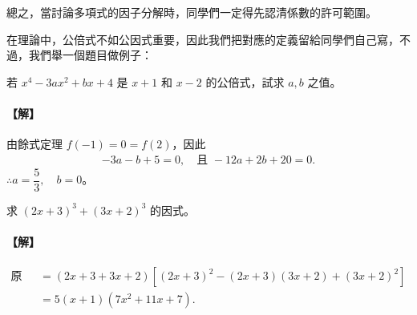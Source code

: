 總之，當討論多項式的因子分解時，同學們一定得先認清係數的許可範圍。

在理論中，公倍式不如公因式重要，因此我們把對應的定義留給同學們自己寫，不過，我們舉一個題目做例子：

\begin{example}\label{ex:7-2-4}
若 $x^4-3ax^2+bx+4$ 是 $x+1$ 和 $x-2$ 的公倍式，試求 $a, b$ 之值。

\paragraph{【解】}
由餘式定理 $f(-1) = 0 = f(2)$，因此
\begin{align*}
  -3a-b+5 = 0, \quad \text{且 } -12a+2b+20 = 0.
\end{align*}
$\therefore a = \dfrac{5}{3}, \quad b = 0$。
\end{example}

\begin{example}\label{ex:7-2-5}
求 $(2x+3)^3+(3x+2)^3$ 的因式。

\paragraph{【解】}
\begin{align*}
  \text{原式} &= (2x+3+3x+2)[(2x+3)^2-(2x+3)(3x+2)+(3x+2)^2] \\
  &= 5(x+1)(7x^2+11x+7).
\end{align*}
\end{example}

